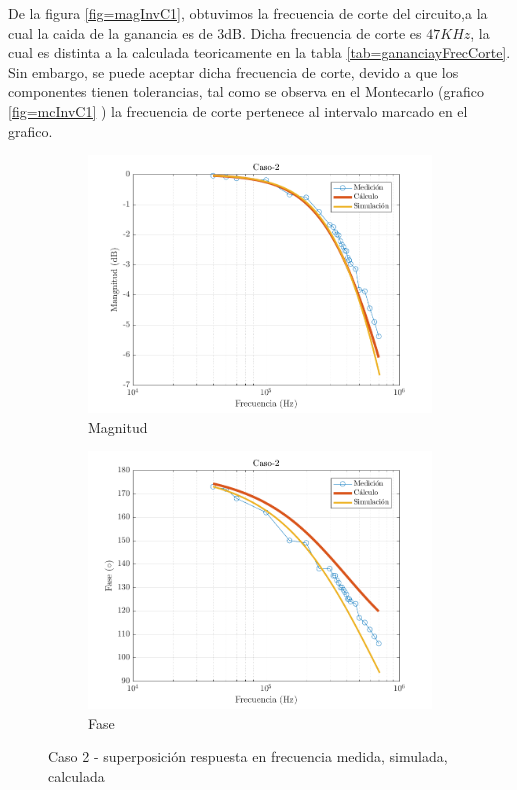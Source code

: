 \documentclass[../../main.tex]{subfiles}
\begin{document}
De la figura \ref{fig=magInvC1}, obtuvimos la frecuencia de corte del circuito,a la cual la caida de la ganancia es de 3dB. Dicha frecuencia de corte es $47KHz$, la cual es distinta a la calculada teoricamente en la tabla \ref{tab=gananciayFrecCorte}. Sin embargo, se puede aceptar dicha frecuencia de corte, devido a que los componentes tienen tolerancias, tal como se observa en el Montecarlo (grafico  \ref{fig=mcInvC1} ) la frecuencia de corte pertenece al intervalo marcado en el grafico.



\begin{figure}[H]
\centering
\begin{subfigure}[http]{0.49\textwidth}
\includegraphics[width=\textwidth]{Caso-2_mag_inv}
\caption{Magnitud}\label{fig=magInvC2}
\end{subfigure}
\begin{subfigure}[http]{0.49\textwidth}
\includegraphics[width=\textwidth]{Caso-2_fase_inv}
\caption{Fase}
\end{subfigure}
\caption{Caso 2 - superposición respuesta en  frecuencia medida, simulada, calculada}
\end{figure}
\end{document}
